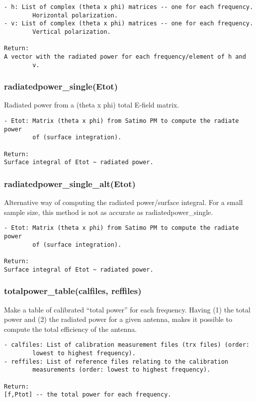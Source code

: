 \begin{verbatim}
- h: List of complex (theta x phi) matrices -- one for each frequency.
        Horizontal polarization.
- v: List of complex (theta x phi) matrices -- one for each frequency.
        Vertical polarization.

Return:
A vector with the radiated power for each frequency/element of h and
        v.
\end{verbatim}

\subsubsection{radiatedpower\_single(Etot)}
Radiated power from a (theta x phi) total E-field matrix.

\begin{verbatim}
- Etot: Matrix (theta x phi) from Satimo PM to compute the radiate power
        of (surface integration).

Return:
Surface integral of Etot ~ radiated power.
\end{verbatim}

\subsubsection{radiatedpower\_single\_alt(Etot)}
Alternative way of computing the radiated power/surface integral. For a small
sample size, this method is not as accurate as radiatedpower\_single.

\begin{verbatim}
- Etot: Matrix (theta x phi) from Satimo PM to compute the radiate power
        of (surface integration).

Return:
Surface integral of Etot ~ radiated power.
\end{verbatim}

\subsubsection{totalpower\_table(calfiles, reffiles)}
Make a table of calibrated ``total power'' for each frequency.
Having (1) the total power and (2) the radiated power for a given antenna,
makes it possible to compute the total efficiency of the antenna.

\begin{verbatim}
- calfiles: List of calibration measurement files (trx files) (order:
        lowest to highest frequency).
- reffiles: List of reference files relating to the calibration
        measurements (order: lowest to highest frequency).

Return:
[f,Ptot] -- the total power for each frequency.
\end{verbatim}

